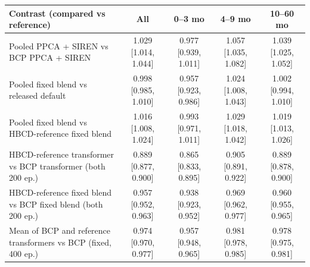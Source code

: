 \begin{tabular}{lcccc}
\toprule
Contrast (compared vs reference) & All & 0--3 mo & 4--9 mo & 10--60 mo \\
\midrule
Pooled PPCA + SIREN vs BCP PPCA + SIREN & 1.029 [1.014, 1.044] & 0.977 [0.939, 1.011] & 1.057 [1.035, 1.082] & 1.039 [1.025, 1.052] \\
Pooled fixed blend vs released default & 0.998 [0.985, 1.010] & 0.957 [0.923, 0.986] & 1.024 [1.008, 1.043] & 1.002 [0.994, 1.010] \\
Pooled fixed blend vs HBCD-reference fixed blend & 1.016 [1.008, 1.024] & 0.993 [0.971, 1.011] & 1.029 [1.018, 1.042] & 1.019 [1.013, 1.026] \\
HBCD-reference transformer vs BCP transformer (both 200 ep.) & 0.889 [0.877, 0.900] & 0.865 [0.833, 0.895] & 0.905 [0.891, 0.922] & 0.889 [0.878, 0.900] \\
HBCD-reference fixed blend vs BCP fixed blend (both 200 ep.) & 0.957 [0.952, 0.963] & 0.938 [0.923, 0.952] & 0.969 [0.962, 0.977] & 0.960 [0.955, 0.965] \\
Mean of BCP and reference transformers vs BCP (fixed, 400 ep.) & 0.974 [0.970, 0.977] & 0.957 [0.948, 0.965] & 0.981 [0.978, 0.985] & 0.978 [0.975, 0.981] \\
\bottomrule
\end{tabular}
